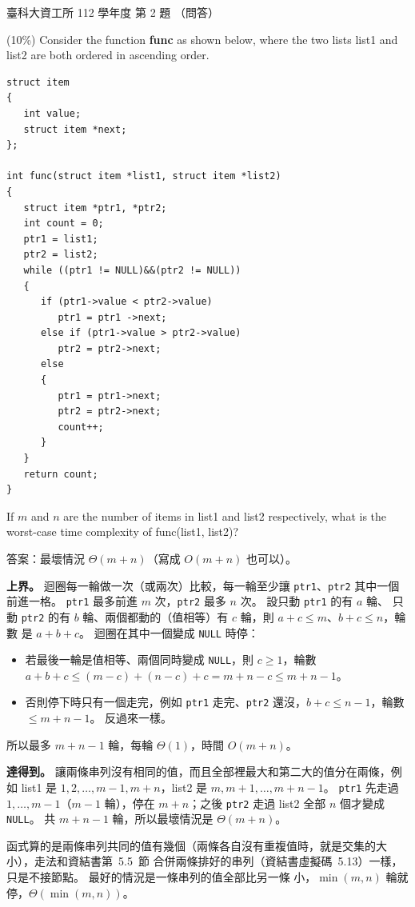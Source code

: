 \begin{pastexam}[label={px:ntust-112-ice-02}]{臺科大資工所 112 學年度 第 2 題}
（問答）

(10\%) Consider the function \textbf{func} as shown below, where the two lists list1 and list2 are
both ordered in ascending order.
\begin{verbatim}
struct item
{
   int value;
   struct item *next;
};

int func(struct item *list1, struct item *list2)
{
   struct item *ptr1, *ptr2;
   int count = 0;
   ptr1 = list1;
   ptr2 = list2;
   while ((ptr1 != NULL)&&(ptr2 != NULL))
   {
      if (ptr1->value < ptr2->value)
         ptr1 = ptr1 ->next;
      else if (ptr1->value > ptr2->value)
         ptr2 = ptr2->next;
      else
      {
         ptr1 = ptr1->next;
         ptr2 = ptr2->next;
         count++;
      }
   }
   return count;
}
\end{verbatim}
If $m$ and $n$ are the number of items in list1 and list2 respectively, what is the worst-case time
complexity of func(list1, list2)?
\end{pastexam}

\begin{pastsoln}
答案：最壞情況 $\Theta(m + n)$（寫成 $O(m + n)$ 也可以）。

\textbf{上界。} 迴圈每一輪做一次（或兩次）比較，每一輪至少讓 \texttt{ptr1}、\texttt{ptr2} 其中一個
前進一格。 \texttt{ptr1} 最多前進 $m$ 次，\texttt{ptr2} 最多 $n$ 次。 設只動 \texttt{ptr1} 的有 $a$ 輪、
只動 \texttt{ptr2} 的有 $b$ 輪、兩個都動的（值相等）有 $c$ 輪，則 $a + c \le m$、$b + c \le n$，輪數
是 $a + b + c$。 迴圈在其中一個變成 \texttt{NULL} 時停：
\begin{itemize}
\item 若最後一輪是值相等、兩個同時變成 \texttt{NULL}，則 $c \ge 1$，輪數
$a + b + c \le (m - c) + (n - c) + c = m + n - c \le m + n - 1$。
\item 否則停下時只有一個走完，例如 \texttt{ptr1} 走完、\texttt{ptr2} 還沒，$b + c \le n - 1$，輪數
$\le m + n - 1$。 反過來一樣。
\end{itemize}
所以最多 $m + n - 1$ 輪，每輪 $\Theta(1)$，時間 $O(m + n)$。

\textbf{達得到。} 讓兩條串列沒有相同的值，而且全部裡最大和第二大的值分在兩條，例如 list1 是
$1, 2, \ldots, m - 1, m + n$，list2 是 $m, m + 1, \ldots, m + n - 1$。 \texttt{ptr1} 先走過
$1, \ldots, m - 1$（$m - 1$ 輪），停在 $m + n$；之後 \texttt{ptr2} 走過 list2 全部 $n$ 個才變成
\texttt{NULL}。 共 $m + n - 1$ 輪，所以最壞情況是 $\Theta(m + n)$。

函式算的是兩條串列共同的值有幾個（兩條各自沒有重複值時，就是交集的大小），走法和資結書第~5.5~節
合併兩條排好的串列（資結書虛擬碼~5.13）一樣，只是不接節點。 最好的情況是一條串列的值全部比另一條
小，$\min(m, n)$ 輪就停，$\Theta(\min(m, n))$。
\end{pastsoln}
